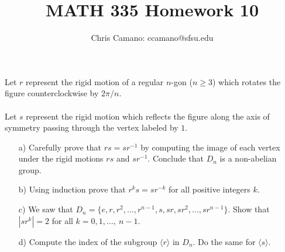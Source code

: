 \documentclass[11pt]{article}
\author{Chris Camano: ccamano@sfsu.edu}
\title{MATH 335 Homework 10 }
\date
\theoremstyle{definition}  %
\newcommand{\block}[2]{\begin{tcolorbox}[title={#1}]{#2}\end{tcolorbox}}
\begin{document}
\maketitle

\block{Question #1}{
 Let $r$ represent the rigid motion of a regular $n$-gon ($n \geq 3$) which rotates the figure counterclockwise by $2\pi/n$. \\\\Let $s$ represent the rigid motion which reflects
  the figure along the axis of symmetry passing through the vertex labeled by $1$.
  \begin{itemize}
  \item[a)] Carefully prove that $rs = sr^{-1}$ by computing the image of each vertex under the rigid motions
    $rs$ and $sr^{-1}$. Conclude that $D_{n}$ is a non-abelian group.
    \\


  \item[b)] Using induction prove that $r^ks = sr^{-k}$ for all positive integers $k$.
   \item[c)] We saw that $D_{n} = \{ e, r, r^2, \ldots, r^{n-1}, s, sr, sr^2, \ldots, sr^{n-1} \}$. Show that $|sr^k| = 2$ for all $k=0,1, \ldots,~{n-1}$.
   \item[d)] Compute the index of the subgroup $\langle r \rangle$ in $D_{n}$. Do the same for $\langle s \rangle$.
  \end{itemize}
  }
\end{document}
